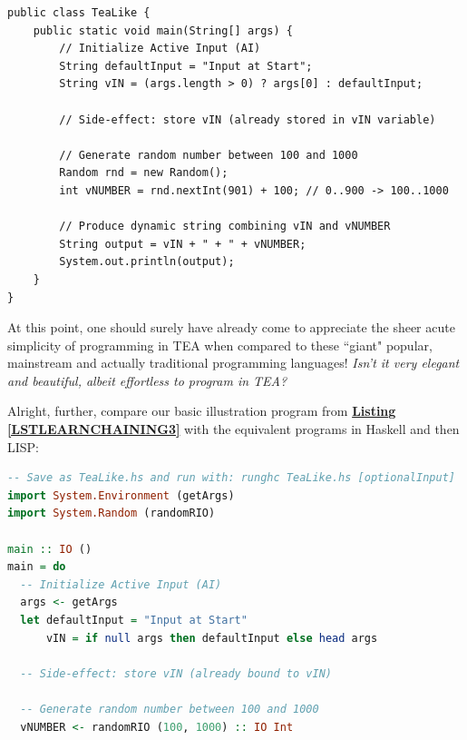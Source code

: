 \documentclass[a4paper, 18pt]{book} %
\begin{document}
{{{\begin{appendices}
\begin{tcolorbox}[myterminalstyle, title=JAVA: TEA-like Sequence-Transformer Chaining Program Flow with String Template Processing, breakable]
\begin{lstlisting}
public class TeaLike {
    public static void main(String[] args) {
        // Initialize Active Input (AI)
        String defaultInput = "Input at Start";
        String vIN = (args.length > 0) ? args[0] : defaultInput;

        // Side-effect: store vIN (already stored in vIN variable)

        // Generate random number between 100 and 1000
        Random rnd = new Random();
        int vNUMBER = rnd.nextInt(901) + 100; // 0..900 -> 100..1000

        // Produce dynamic string combining vIN and vNUMBER
        String output = vIN + " + " + vNUMBER;
        System.out.println(output);
    }
}
\end{lstlisting}
  \end{tcolorbox}



\vspace{2em}

At this point, one should surely have already come to appreciate the sheer acute simplicity of programming in TEA when compared to these ``giant" popular, mainstream and actually traditional programming languages! \textit{Isn't it very elegant and beautiful, albeit effortless to program in TEA?}

\vspace{2em}

Alright, further, compare our basic illustration program from \textbf{\hyperref[LSTLEARNCHAINING3]{Listing \ref{LSTLEARNCHAINING3}}} with the equivalent programs in Haskell and then LISP:


  \begin{tcolorbox}[myterminalstyle, title=HASKELL: TEA-like Sequence-Transformer Chaining Program Flow with String Template Processing, breakable]
\begin{lstlisting}[language=Haskell,]
-- Save as TeaLike.hs and run with: runghc TeaLike.hs [optionalInput]
import System.Environment (getArgs)
import System.Random (randomRIO)

main :: IO ()
main = do
  -- Initialize Active Input (AI)
  args <- getArgs
  let defaultInput = "Input at Start"
      vIN = if null args then defaultInput else head args

  -- Side-effect: store vIN (already bound to vIN)

  -- Generate random number between 100 and 1000
  vNUMBER <- randomRIO (100, 1000) :: IO Int


\end{lstlisting}
\end{tcolorbox}
\end{appendices}}}}
\end{document}
